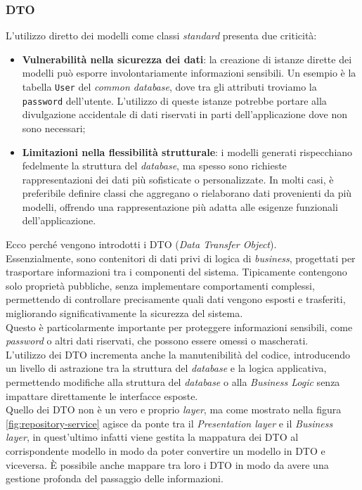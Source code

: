 \subsubsection{DTO}\label{chap:dto}
L'utilizzo diretto dei modelli come classi \textit{standard} presenta due criticità:
\begin{itemize}
    \item \textbf{Vulnerabilità nella sicurezza dei dati}: la creazione di istanze dirette dei modelli può esporre 
          involontariamente informazioni sensibili. Un esempio è la tabella \texttt{User} del \textit{common database}, 
          dove tra gli attributi troviamo la \texttt{password} dell'utente. L'utilizzo di queste 
          istanze potrebbe portare alla divulgazione accidentale di dati riservati in parti dell'applicazione dove 
          non sono necessari;
    \item \textbf{Limitazioni nella flessibilità strutturale}: i modelli generati rispecchiano fedelmente la struttura 
        del \textit{database}, ma spesso sono richieste rappresentazioni dei dati più sofisticate o personalizzate. 
          In molti casi, è preferibile definire classi che aggregano o rielaborano dati provenienti da più modelli, 
          offrendo una rappresentazione più adatta alle esigenze funzionali dell'applicazione.
\end{itemize}
Ecco perché vengono introdotti i DTO (\textit{Data Transfer Object}).\\
Essenzialmente, sono contenitori di dati privi di logica di \textit{business}, progettati per trasportare informazioni tra i 
componenti del sistema. Tipicamente contengono solo proprietà pubbliche, senza implementare comportamenti complessi, 
permettendo di controllare precisamente quali dati vengono esposti e trasferiti, migliorando significativamente la 
sicurezza del sistema.\\
Questo è particolarmente importante per proteggere informazioni sensibili, come \textit{password} o altri dati riservati, 
che possono essere omessi o mascherati.\\
L'utilizzo dei DTO incrementa anche la manutenibilità del codice, introducendo un livello di astrazione tra la 
struttura del \textit{database} e la logica applicativa, permettendo modifiche alla 
struttura del \textit{database} o alla \textit{Business Logic} senza impattare direttamente le interfacce esposte.\\
Quello dei DTO non è un vero e proprio \textit{layer}, ma come mostrato nella figura \ref{fig:repository-service} agisce 
da ponte tra il \textit{Presentation layer} e il \textit{Business layer}, in quest'ultimo infatti viene gestita la 
mappatura dei DTO al corrispondente modello in modo da poter convertire un modello in DTO e viceversa.
È possibile anche mappare tra loro i DTO in modo da avere una gestione profonda del passaggio delle informazioni.